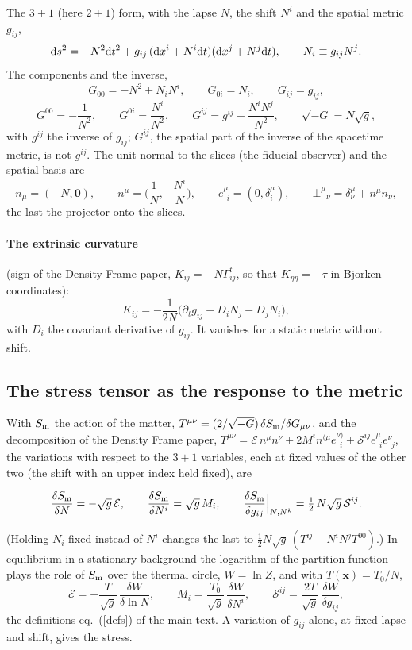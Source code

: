 \documentclass[11pt,aps,preprint,nofootinbib,superscriptaddress,tightenlines]{revtex4-2}
\def\edense{{\mathcal{E}}}
\def\pdense{M}
\def\Sstress{{\mathcal S}}
\def\dd{{\rm d}}
\newcommand{\ve}[2]{e_{\;\,#1}^{#2}}
\def\st{\begin{equation}}
\def\stp{\end{equation}}
\def\Eq#1{eq.~(\ref{#1})}
\let\oldparagraph\paragraph
\renewcommand{\paragraph}{\par\bigskip\oldparagraph}
\begin{document}
The $3+1$ (here $2+1$) form, with the lapse $N$, the shift $N^i$ and the spatial metric $g_{ij}$,
\st
\dd s^2=-N^2\dd t^2+g_{ij}\,(\dd x^i+N^i\dd t)(\dd x^j+N^j\dd t),\qquad N_i\equiv g_{ij}N^j .
\stp
The components and the inverse,
\st
G_{00}=-N^2+N_iN^i,\qquad G_{0i}=N_i,\qquad G_{ij}=g_{ij},
\stp
\st
G^{00}=-\frac1{N^2},\qquad G^{0i}=\frac{N^i}{N^2},\qquad G^{ij}=g^{ij}-\frac{N^iN^j}{N^2},\qquad \sqrt{-G}=N\sqrt g ,
\stp
with $g^{ij}$ the inverse of $g_{ij}$; $G^{ij}$, the spatial part of the inverse of the spacetime metric, is not $g^{ij}$.  The unit normal to the slices (the fiducial observer) and the spatial basis are
\st
n_\mu=(-N,\bm 0),\qquad n^\mu=\Big(\frac1N,-\frac{N^i}N\Big),\qquad \ve{i}{\mu}=(0,\delta^\mu_i),\qquad \bot^\mu{}_\nu=\delta^\mu_\nu+n^\mu n_\nu ,
\stp
the last the projector onto the slices.

\paragraph{The extrinsic curvature} (sign of the Density Frame paper, $K_{ij}=-N\Gamma^t_{ij}$, so that $K_{\eta\eta}=-\tau$ in Bjorken coordinates):
\st
K_{ij}=-\frac1{2N}\Big(\partial_tg_{ij}-D_iN_j-D_jN_i\Big),
\stp
with $D_i$ the covariant derivative of $g_{ij}$.  It vanishes for a static metric without shift.

\subsection{The stress tensor as the response to the metric}

With $S_{\rm m}$ the action of the matter, $T^{\mu\nu}=(2/\sqrt{-G})\,\delta S_{\rm m}/\delta G_{\mu\nu}$, and the decomposition of the Density Frame paper,
$T^{\mu\nu}=\edense\,n^\mu n^\nu+2\pdense^in^{(\mu}\ve{i}{\nu)}+\Sstress^{ij}\ve{i}{\mu}\ve{j}{\nu}$, the variations with respect to the $3+1$ variables, each at fixed values of
the other two (the shift with an upper index held fixed), are
\begin{keyeq}
\st
\frac{\delta S_{\rm m}}{\delta N}=-\sqrt g\,\edense,\qquad
\frac{\delta S_{\rm m}}{\delta N^i}=\sqrt g\,\pdense_i,\qquad
\frac{\delta S_{\rm m}}{\delta g_{ij}}\Big|_{N,N^k}=\tfrac12\,N\sqrt g\,\Sstress^{ij} .
\label{admresponse}
\stp
\end{keyeq}
(Holding $N_i$ fixed instead of $N^i$ changes the last to $\tfrac12N\sqrt g\,(T^{ij}-N^iN^jT^{00})$.)  In equilibrium in a stationary background the logarithm of the
partition function plays the role of $S_{\rm m}$ over the thermal circle, $W=\ln Z$, and with $T(\bm x)=T_0/N$,
\st
\edense=-\frac{T}{\sqrt g}\,\frac{\delta W}{\delta\ln N},\qquad \pdense_i=\frac{T_0}{\sqrt g}\,\frac{\delta W}{\delta N^i},\qquad
\Sstress^{ij}=\frac{2T}{\sqrt g}\,\frac{\delta W}{\delta g_{ij}} ,
\stp
the definitions \Eq{defs} of the main text.  A variation of $g_{ij}$ alone, at fixed lapse and shift, gives the stress.
\end{document}
